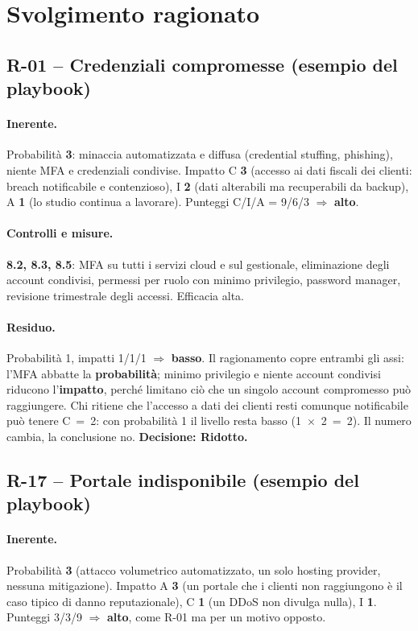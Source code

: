 \section{Svolgimento ragionato}

\subsection{R-01 -- Credenziali compromesse (esempio del playbook)}
\paragraph{Inerente.} Probabilità \textbf{3}: minaccia automatizzata e diffusa (credential stuffing,
phishing), niente MFA e credenziali condivise. Impatto C \textbf{3} (accesso ai dati fiscali dei clienti:
breach notificabile e contenzioso), I \textbf{2} (dati alterabili ma recuperabili da backup), A \textbf{1}
(lo studio continua a lavorare). Punteggi C/I/A = 9/6/3 $\Rightarrow$ \textbf{alto}.

\paragraph{Controlli e misure.} \textbf{8.2, 8.3, 8.5}: MFA su tutti i servizi cloud e sul gestionale,
eliminazione degli account condivisi, permessi per ruolo con minimo privilegio, password manager, revisione
trimestrale degli accessi. Efficacia alta.

\paragraph{Residuo.} Probabilità 1, impatti 1/1/1 $\Rightarrow$ \textbf{basso}. Il ragionamento copre
entrambi gli assi: l'MFA abbatte la \textbf{probabilità}; minimo privilegio e niente account condivisi
riducono l'\textbf{impatto}, perché limitano ciò che un singolo account compromesso può raggiungere. Chi
ritiene che l'accesso a dati dei clienti resti comunque notificabile può tenere C~=~2: con probabilità 1 il
livello resta basso (1~$\times$~2~=~2). Il numero cambia, la conclusione no.
\textbf{Decisione: Ridotto.}

\subsection{R-17 -- Portale indisponibile (esempio del playbook)}
\paragraph{Inerente.} Probabilità \textbf{3} (attacco volumetrico automatizzato, un solo hosting
provider, nessuna mitigazione). Impatto A \textbf{3} (un portale che i clienti non raggiungono è il caso
tipico di danno reputazionale), C \textbf{1} (un DDoS non divulga nulla), I \textbf{1}. Punteggi 3/3/9
$\Rightarrow$ \textbf{alto}, come R-01 ma per un motivo opposto.

